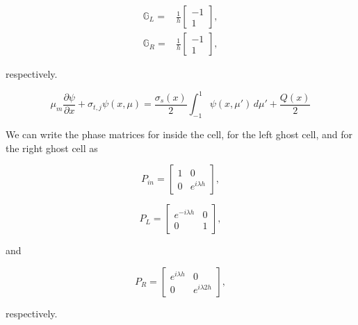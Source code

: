 \begin{equation}
\label{eq::App_DSA_MIP_1D_facegrad_matrices}
\begin{aligned}
	\mathbb{G}_L =& \frac{1}{h}
	\left[ \begin{array}{c}
	-1  \\
	1 
	\end{array} \right] ,\\
	\mathbb{G}_R =& \frac{1}{h}
	\left[ \begin{array}{c}
	-1  \\
	1
	\end{array} \right] ,
\end{aligned}
\end{equation}

\noindent respectively.


\begin{equation}
\label{eq::App_DSA_1D_transport_discrete}
\mu_m \frac{\partial \psi}{\partial x} + \sigma_{t,j} \psi(x,\mu) = \frac{\sigma_s (x)}{2} \int_{-1}^{1} \psi(x,\mu') \, d\mu' + \frac{Q(x)}{2}
\end{equation}

We can write the phase matrices for inside the cell, for the left ghost cell, and for the right ghost cell as

\begin{equation}
\label{eq::App_DSA_1D_Pin}
P_{in} = \left[ \begin{array}{cc}
	1 & 0 \\
	0 & e^{i \lambda h}
	\end{array} \right],
\end{equation}

\begin{equation}
\label{eq::App_DSA_1D_PL}
P_L = \left[ \begin{array}{cc}
	e^{-i \lambda h} & 0 \\
	0 & 1
	\end{array} \right],
\end{equation}

\noindent and 

\begin{equation}
\label{eq::App_DSA_1D_PR}
P_R = \left[ \begin{array}{cc}
	e^{i \lambda h} & 0 \\
	0 & e^{i \lambda 2h}
	\end{array} \right],
\end{equation}

\noindent respectively.

